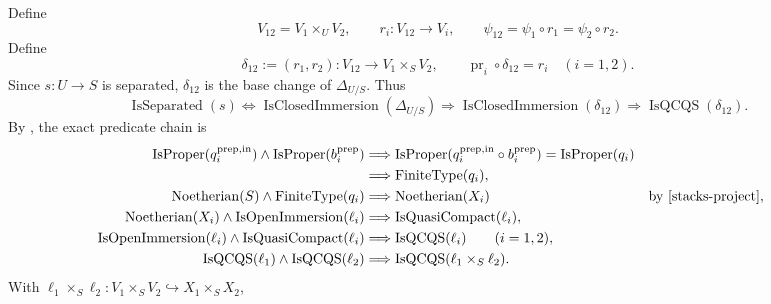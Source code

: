\begin{definition}
  \label{def:nagata-two-open-comparison-space}
  \lean{}

  Define
  \[
    V_{12}=V_1\times_UV_2,\qquad
    r_i\colon V_{12}\to V_i,\qquad
    \psi_{12}=\psi_1\circ r_1=\psi_2\circ r_2.
  \]
  Define
  \[
    \delta_{12}:=(r_1,r_2)\colon V_{12}\to V_1\times_SV_2,
    \qquad
    \operatorname{pr}_i\circ\delta_{12}=r_i\quad(i=1,2).
  \]
  Since $s\colon U\to S$ is separated,
  $\delta_{12}$ is the base change of $\Delta_{U/S}$.  Thus
  \[
    \operatorname{IsSeparated}(s)
      \Longleftrightarrow
        \operatorname{IsClosedImmersion}(\Delta_{U/S})
      \Longrightarrow
        \operatorname{IsClosedImmersion}(\delta_{12})
      \Longrightarrow
        \operatorname{IsQCQS}(\delta_{12}).
  \]
  By ,
  the exact predicate chain is
  \[
  \begin{aligned}
    \operatorname{IsProper}(q_i^{\mathrm{prep,in}})\wedge
      \operatorname{IsProper}(b_i^{\mathrm{prep}})
      &\Longrightarrow
        \operatorname{IsProper}
          (q_i^{\mathrm{prep,in}}\circ b_i^{\mathrm{prep}})
       =\operatorname{IsProper}(q_i)\\
      &\Longrightarrow\operatorname{FiniteType}(q_i),\\
    \operatorname{Noetherian}(S)\wedge\operatorname{FiniteType}(q_i)
      &\Longrightarrow\operatorname{Noetherian}(X_i)
       &&\text{by \cite[Tag 01T6]{stacks-project}},\\
    \operatorname{Noetherian}(X_i)\wedge
      \operatorname{IsOpenImmersion}(\ell_i)
      &\Longrightarrow\operatorname{IsQuasiCompact}(\ell_i),\\
    \operatorname{IsOpenImmersion}(\ell_i)\wedge
      \operatorname{IsQuasiCompact}(\ell_i)
      &\Longrightarrow\operatorname{IsQCQS}(\ell_i)
      \qquad(i=1,2),\\
    \operatorname{IsQCQS}(\ell_1)\wedge
      \operatorname{IsQCQS}(\ell_2)
      &\Longrightarrow
        \operatorname{IsQCQS}(\ell_1\times_S\ell_2).
  \end{aligned}
  \]
  With
  $\ell_1\times_S\ell_2\colon V_1\times_SV_2\hookrightarrow X_1\times_SX_2$,

\end{definition}
